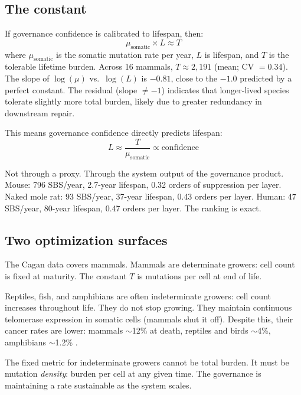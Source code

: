 \documentclass[11pt]{article}
\theoremstyle{definition}
\begin{document}
\subsection{The constant}

If governance confidence is calibrated to lifespan, then:
\[
\mu_{\text{somatic}} \times L \approx T
\]
where $\mu_{\text{somatic}}$ is the somatic mutation rate per year,
$L$ is lifespan, and $T$ is the tolerable lifetime burden. Across
16 mammals, $T \approx 2{,}191$ (mean; CV $= 0.34$). The slope of
$\log(\mu)$ vs.\ $\log(L)$ is $-0.81$, close to the $-1.0$ predicted
by a perfect constant. The residual (slope $\neq -1$) indicates that
longer-lived species tolerate slightly more total burden, likely due
to greater redundancy in downstream repair.

This means governance confidence directly predicts lifespan:
\[
L \approx \frac{T}{\mu_{\text{somatic}}} \propto \text{confidence}
\]

Not through a proxy. Through the system output of the governance
product. Mouse: 796 SBS/year, 2.7-year lifespan, 0.32 orders of
suppression per layer. Naked mole rat: 93 SBS/year, 37-year lifespan,
0.43 orders per layer. Human: 47 SBS/year, 80-year lifespan, 0.47
orders per layer. The ranking is exact.

\subsection{Two optimization surfaces}

The Cagan data covers mammals. Mammals are determinate growers: cell
count is fixed at maturity. The constant $T$ is mutations per cell at
end of life.

Reptiles, fish, and amphibians are often indeterminate growers:
cell count increases throughout life. They do not stop growing.
They maintain continuous telomerase expression in somatic cells
(mammals shut it off). Despite this, their cancer rates are lower:
mammals $\sim$12\% at death, reptiles and birds $\sim$4\%,
amphibians $\sim$1.2\% \cite{Vincze2024}.

The fixed metric for indeterminate growers cannot be total burden. It
must be mutation \emph{density}: burden per cell at any given time.
The governance is maintaining a rate sustainable as the system scales.
\end{document}

